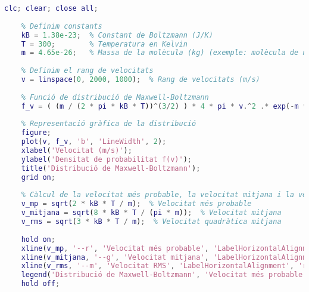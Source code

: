 \begin{lstlisting}[language=Matlab, caption={Codi Matlab per dibuixar una distribució de Maxwell-Boltzmann}]
    clc; clear; close all;
    
    % Definim constants
    kB = 1.38e-23;  % Constant de Boltzmann (J/K)
    T = 300;        % Temperatura en Kelvin
    m = 4.65e-26;   % Massa de la molècula (kg) (exemple: molècula de nitrogen)
    
    % Definim el rang de velocitats
    v = linspace(0, 2000, 1000);  % Rang de velocitats (m/s)
    
    % Funció de distribució de Maxwell-Boltzmann
    f_v = ( (m / (2 * pi * kB * T))^(3/2) ) * 4 * pi * v.^2 .* exp(-m * v.^2 / (2 * kB * T));
    
    % Representació gràfica de la distribució
    figure;
    plot(v, f_v, 'b', 'LineWidth', 2);
    xlabel('Velocitat (m/s)');
    ylabel('Densitat de probabilitat f(v)');
    title('Distribució de Maxwell-Boltzmann');
    grid on;
    
    % Càlcul de la velocitat més probable, la velocitat mitjana i la velocitat quadràtica mitjana
    v_mp = sqrt(2 * kB * T / m);  % Velocitat més probable
    v_mitjana = sqrt(8 * kB * T / (pi * m));  % Velocitat mitjana
    v_rms = sqrt(3 * kB * T / m);  % Velocitat quadràtica mitjana
    
    hold on;
    xline(v_mp, '--r', 'Velocitat més probable', 'LabelHorizontalAlignment', 'right');
    xline(v_mitjana, '--g', 'Velocitat mitjana', 'LabelHorizontalAlignment', 'right');
    xline(v_rms, '--m', 'Velocitat RMS', 'LabelHorizontalAlignment', 'right');
    legend('Distribució de Maxwell-Boltzmann', 'Velocitat més probable', 'Velocitat mitjana', 'Velocitat RMS');
    hold off;
    \end{lstlisting}